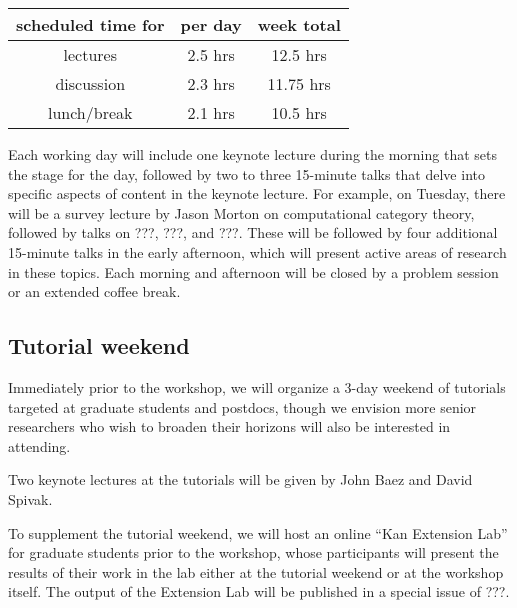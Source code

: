 \documentclass{article}
\newcommand{\redout}[1]{{\color{red}#1}}
\begin{document}
\begin{table}[h!]
\begin{center}
\begin{tabular}{|c|c|c|} \hline
scheduled time for & per day & week total \\ \hline
lectures & 2.5 hrs & 12.5 hrs  \\
discussion & 2.3 hrs & 11.75 hrs \\
lunch/break & 2.1 hrs & 10.5 hrs \\ \hline
\end{tabular}
\end{center}
\end{table}%

Each working day will include one keynote lecture during the morning that sets the stage for the day, followed by two to three 15-minute talks that delve into specific aspects of content in the keynote lecture. For example, on Tuesday, there will be a survey lecture by \redout{Jason Morton} on computational category theory, followed by talks on \redout{???}, \redout{???}, and \redout{???}. These will be followed by four additional 15-minute talks in the early afternoon, which will present active areas of research in these topics. Each morning and afternoon will be closed by a problem session or an extended coffee break. 


\subsection{Tutorial weekend}
Immediately prior to the workshop, we will organize a 3-day weekend of tutorials targeted at graduate students and postdocs, though we envision more senior researchers who wish to broaden their horizons will also be interested in attending.

Two keynote lectures at the tutorials will be given by \redout{John Baez and David Spivak}.

To supplement the tutorial weekend, we will host an online ``Kan Extension Lab'' for graduate students prior to the workshop, whose participants will present the results of their work in the lab either at the tutorial weekend or at the workshop itself. The output of the Extension Lab will be published in a special issue of \redout{???}.
\end{document}

